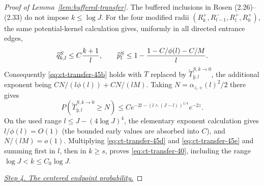\begin{proof}[Proof of Lemma~\ref{lem:buffered-transfer}]
The buffered inclusions in Rosen (2.26)--(2.33) do not impose
$k\le\log J$.  For the four modified radii
$(R_k^+,R_{l-1}^-,R_l^+,R_0^+)$, the same potential-kernel
calculation gives, uniformly in all directed entrance edges,
\begin{equation}
\widetilde q_{k,l}^S\le C{k+1\over l},\qquad
 \widetilde p_l^S
 \le1-\frac{1-C/\phi(l)-C/M}{l}.\label{eq:ct-transfer-45d2}
\end{equation}
Consequently \eqref{eq:ct-transfer-45b} holds with $T$ replaced by
$\widetilde T_{\widehat y,l}^{S,k\to0}$, the additional exponent being
$CN/(l\phi(l))+CN/(lM)$.  Taking
$N=\alpha_{z,+}(l)^2/2$ there gives
\begin{equation}
P(\widetilde T_{\widehat y,l}^{S,k\to0}\ge N)
 \le C e^{-2l-(l\wedge(J-l))^{1/4}}e^{-2z}.\label{eq:ct-transfer-45e}
\end{equation}
On the used range $l\le J-(4\log J)^4$, the elementary exponent
calculation gives $l/\phi(l)=O(1)$ (the bounded early values are
absorbed into $C$), and $N/(lM)=o(1)$.  Multiplying \eqref{eq:ct-transfer-45d} and \eqref{eq:ct-transfer-45e}
and summing first in $l$, then in $k\ge s$, proves \eqref{eq:ct-transfer-40}, including
the range $\log J<k\le C_0\log J$.

\smallskip\noindent
\underline{\textit{Step 4. The centered endpoint probability.}}


\end{proof}
